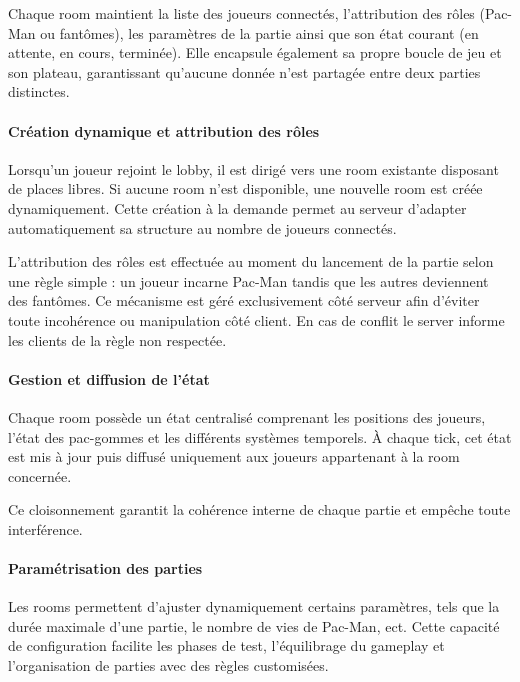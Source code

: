 \documentclass[a4paper, 11pt]{report}
\begin{document}
Chaque room maintient la liste des joueurs connectés, l’attribution des rôles (Pac-Man ou fantômes), les paramètres de la partie ainsi que son état courant (en attente, en cours, terminée). 
Elle encapsule également sa propre boucle de jeu et son plateau, garantissant qu’aucune donnée n’est partagée entre deux parties distinctes.

\paragraph{Création dynamique et attribution des rôles}

Lorsqu’un joueur rejoint le lobby, il est dirigé vers une room existante disposant de places libres. 
Si aucune room n’est disponible, une nouvelle room est créée dynamiquement.
Cette création à la demande permet au serveur d’adapter automatiquement sa structure au nombre de joueurs connectés.

L’attribution des rôles est effectuée au moment du lancement de la partie selon une règle simple : un joueur incarne Pac-Man tandis que les autres deviennent des fantômes. 
Ce mécanisme est géré exclusivement côté serveur afin d’éviter toute incohérence ou manipulation côté client.
En cas de conflit le server informe les clients de la règle non respectée.

\paragraph{Gestion et diffusion de l’état}

Chaque room possède un état centralisé comprenant les positions des joueurs, l’état des pac-gommes et les différents systèmes temporels. 
À chaque tick, cet état est mis à jour puis diffusé uniquement aux joueurs appartenant à la room concernée.

Ce cloisonnement garantit la cohérence interne de chaque partie et empêche toute interférence. 

\paragraph{Paramétrisation des parties}

Les rooms permettent d’ajuster dynamiquement certains paramètres, tels que la durée maximale d’une partie, le nombre de vies de Pac-Man, ect. 
Cette capacité de configuration facilite les phases de test, l’équilibrage du gameplay et l’organisation de parties avec des règles customisées.
\end{document}
